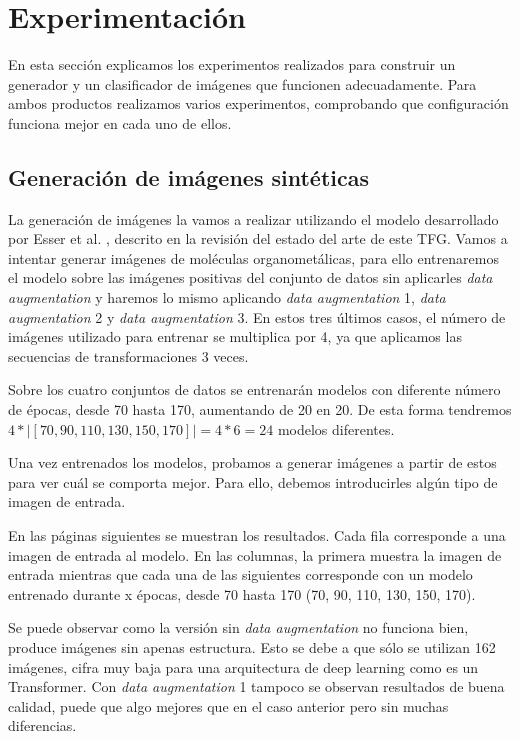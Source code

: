 \chapter{Experimentación}
En esta sección explicamos los experimentos realizados para construir un generador y un clasificador de imágenes que funcionen adecuadamente. Para ambos productos realizamos varios experimentos, comprobando que configuración funciona mejor en cada uno de ellos.

\section{Generación de imágenes sintéticas}
La generación de imágenes la vamos a realizar utilizando el modelo desarrollado por Esser et al. \cite{esser2021taming}, descrito en la revisión del estado del arte de este TFG. Vamos a intentar generar imágenes de moléculas organometálicas, para ello entrenaremos el modelo sobre las imágenes positivas del conjunto de datos sin aplicarles \textit{data augmentation} y haremos lo mismo aplicando \textit{data augmentation} 1, \textit{data augmentation} 2 y \textit{data augmentation} 3. En estos tres últimos casos, el número de imágenes utilizado para entrenar se multiplica por 4, ya que aplicamos las secuencias de transformaciones 3 veces. 

Sobre los cuatro conjuntos de datos se entrenarán modelos con diferente número de épocas, desde 70 hasta 170, aumentando de 20 en 20. De esta forma tendremos $4 * |[70, 90, 110, 130, 150, 170]| = 4 * 6 = 24$ modelos diferentes.

Una vez entrenados los modelos, probamos a generar imágenes a partir de estos para ver cuál se comporta mejor. Para ello, debemos introducirles algún tipo de imagen de entrada. 

En las páginas siguientes se muestran los resultados. Cada fila corresponde a una imagen de entrada al modelo. En las columnas, la primera muestra la imagen de entrada mientras que cada una de las siguientes corresponde con un modelo entrenado durante x épocas, desde 70 hasta 170 (70, 90, 110, 130, 150, 170).

Se puede observar como la versión sin \textit{data augmentation} no funciona bien, produce imágenes sin apenas estructura. Esto se debe a que sólo se utilizan 162 imágenes, cifra muy baja para una arquitectura de deep learning como es un Transformer. Con \textit{data augmentation} 1 tampoco se observan resultados de buena calidad, puede que algo mejores que en el caso anterior pero sin muchas diferencias.

